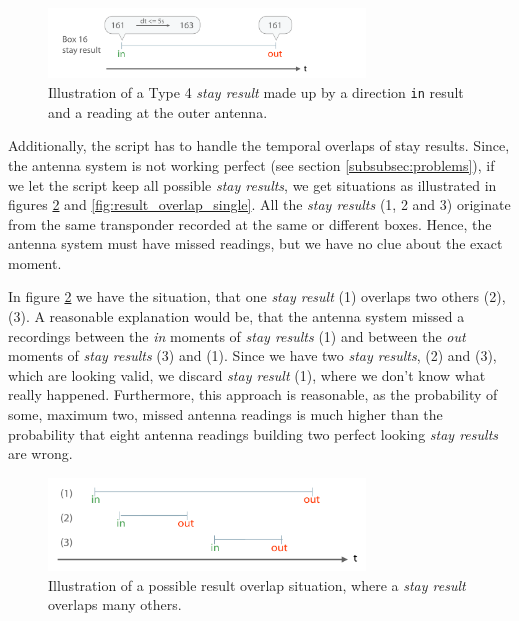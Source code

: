 \begin{figure}[htpb]
\begin{center}
  \includegraphics[width=0.75\textwidth]{assets/pdf/stay_result_type_4_schema.pdf}
  \caption[Illustration of a type 4 \textit{stay result}]{Illustration of a Type 4 \textit{stay result} made up by a direction \lstinline|in| result and a reading at the outer antenna.}
  \label{fig:type_4_stay_result}
\end{center}
\end{figure}

Additionally, the script has to handle the temporal overlaps of stay results. Since, the antenna system is not working perfect (see section \ref{subsubsec:problems}), if we let the script keep all possible \textit{stay results}, we get situations as illustrated in figures \ref{fig:result_overlap} and \ref{fig:result_overlap_single}. All the \textit{stay results} (1, 2 and 3) originate from the same transponder recorded at the same or different boxes. Hence, the antenna system must have missed readings, but we have no clue about the exact moment.  

In figure \ref{fig:result_overlap} we have the situation, that one \textit{stay result} (1) overlaps two others (2),(3). A reasonable explanation would be, that the antenna system missed a recordings between the \textit{in} moments of \textit{stay results} (1) and between the \textit{out} moments of \textit{stay results} (3) and (1). Since we have two \textit{stay results}, (2) and (3), which are looking valid, we discard \textit{stay result} (1), where we don't know what really happened. Furthermore, this approach is reasonable, as the probability of some, maximum two, missed antenna readings is much higher than the probability that eight antenna readings building two perfect looking \textit{stay results} are wrong.
 
\begin{figure}[htpb]
\begin{center}
  \includegraphics[width=0.75\textwidth]{assets/pdf/result_overlaps_schema.pdf}
  \caption[Illustration of a possible result overlap situation]{Illustration of a possible result overlap situation, where a \textit{stay result} overlaps many others.}
  \label{fig:result_overlap}
\end{center}
\end{figure}

